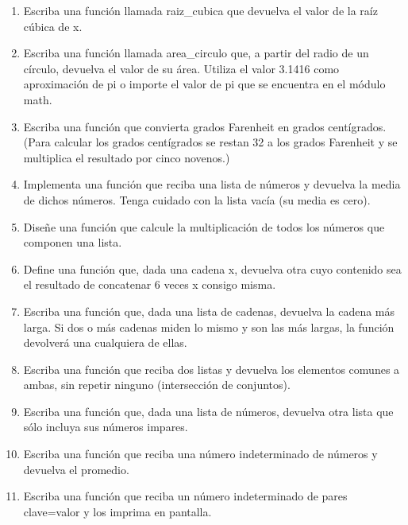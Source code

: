 \begin{enumerate}
\item Escriba una función llamada raiz\_cubica que devuelva el valor de la raíz cúbica de x.

\item Escriba una función llamada area\_circulo que, a partir del radio de un círculo, devuelva el valor de su área. Utiliza el valor 3.1416 como aproximación de pi o importe el valor de pi que se encuentra en el módulo math.

\item Escriba una función que convierta grados Farenheit en grados centígrados. (Para calcular los grados centígrados se restan 32 a los grados Farenheit y se multiplica el resultado por cinco novenos.)

\item Implementa una función que reciba una lista de números y devuelva la media de dichos números. Tenga cuidado con la lista vacía (su media es cero).

\item Diseñe una función que calcule la multiplicación de todos los números que componen una lista.

\item Define una función que, dada una cadena x, devuelva otra cuyo contenido sea el resultado de concatenar 6 veces x consigo misma.

\item Escriba una función que, dada una lista de cadenas, devuelva la cadena más larga. Si dos o más cadenas miden lo mismo y son las más largas, la función devolverá una cualquiera de ellas.

\item Escriba una función que reciba dos listas y devuelva los elementos comunes a ambas, sin repetir ninguno (intersección de conjuntos).

\item Escriba una función que, dada una lista de números, devuelva otra lista que sólo incluya sus números impares.

\item Escriba una función que reciba una número indeterminado de números y devuelva el promedio.

\item Escriba una función que reciba un número indeterminado de pares clave=valor y los imprima en pantalla.
\end{enumerate}